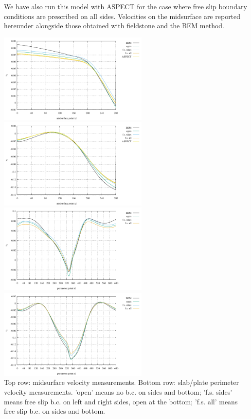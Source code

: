 We have also run this model with ASPECT for the case where free slip 
boundary conditions are prescribed on all sides. 
Velocities on the midsurface are reported hereunder alongside those
obtained with fieldstone and the BEM method.

\begin{center}
\includegraphics[width=7.5cm]{python_codes/fieldstone_55/images/u_midsurface}
\includegraphics[width=7.5cm]{python_codes/fieldstone_55/images/v_midsurface}\\
\includegraphics[width=7.5cm]{python_codes/fieldstone_55/images/u_perimeter}
\includegraphics[width=7.5cm]{python_codes/fieldstone_55/images/v_perimeter}\\
{\captionfont Top row: midsurface velocity measurements. Bottom row: slab/plate perimeter 
velocity measurements. 'open' means no b.c. on sides and bottom; 'f.s. sides' means 
free slip b.c. on left and right sides, open at the bottom; 'f.s. all' means 
free slip b.c. on sides and bottom.}
\end{center}

